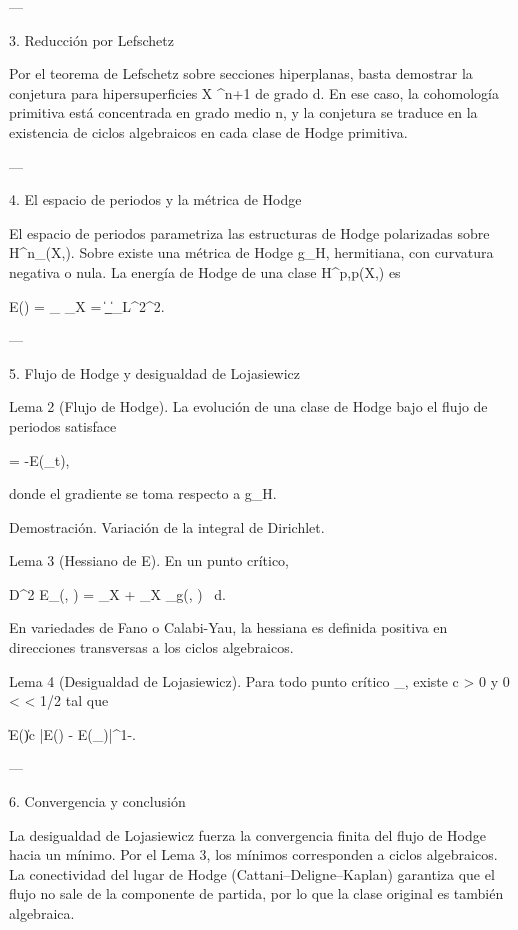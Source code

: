 \documentclass[12pt,twoside]{book}
\begin{document}
---

3. Reducción por Lefschetz

Por el teorema de Lefschetz sobre secciones hiperplanas, basta demostrar la conjetura para hipersuperficies X \subset {}^{n+1} de grado d. En ese caso, la cohomología primitiva está concentrada en grado medio n, y la conjetura se traduce en la existencia de ciclos algebraicos en cada clase de Hodge primitiva.

---

4. El espacio de periodos y la métrica de Hodge

El espacio de periodos  parametriza las estructuras de Hodge polarizadas sobre H^n_{}(X,). Sobre  existe una métrica de Hodge g_H, hermitiana, con curvatura negativa o nula. La energía de Hodge de una clase \alpha \in H^{p,p}(X,) es

E(\alpha) = \inf_{\omega \in \alpha} \int_X \omega \wedge * \omega = \|\omega_{}\|_{L^2}^2.

---

5. Flujo de Hodge y desigualdad de Lojasiewicz

Lema 2 (Flujo de Hodge). La evolución de una clase de Hodge bajo el flujo de periodos satisface

 = -\nabla E(\alpha_t),

donde el gradiente se toma respecto a g_H.

Demostración. Variación de la integral de Dirichlet.

Lema 3 (Hessiano de E). En un punto crítico,

D^2 E_\alpha(\beta, \beta) = \int_X \nabla \beta \wedge * \nabla \beta + \int_X _g(\beta, \beta) \, d.

En variedades de Fano o Calabi-Yau, la hessiana es definida positiva en direcciones transversas a los ciclos algebraicos.

Lema 4 (Desigualdad de Lojasiewicz). Para todo punto crítico \alpha_\infty, existe c > 0 y 0 < \theta < 1/2 tal que

\|\nabla E(\alpha)\| \ge c |E(\alpha) - E(\alpha_\infty)|^{1-\theta}.

---

6. Convergencia y conclusión

La desigualdad de Lojasiewicz fuerza la convergencia finita del flujo de Hodge hacia un mínimo. Por el Lema 3, los mínimos corresponden a ciclos algebraicos. La conectividad del lugar de Hodge (Cattani–Deligne–Kaplan) garantiza que el flujo no sale de la componente de partida, por lo que la clase original \alpha es también algebraica.
\end{document}
